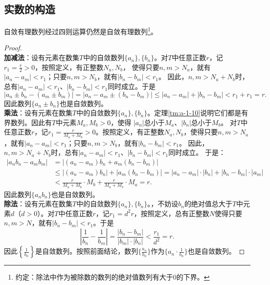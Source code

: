 \documentclass[12pt,UTF8]{ctexbook}
\begin{document}
\begin{appendix}
\section{实数的构造}

\begin{tm}\label{tm:a-1-3}
    自敛有理数列经过四则运算仍然是自敛有理数列\footnote{约定：除法中作为被除数的数列的绝对值数列有大于$0$的下界。}。
\end{tm}
\begin{proof}
    \mbox{} \\
    \textbf{加减法}：设有元素在数集$T$中的自敛数列$\{a_n\}, \{b_n\}$。对$T$中任意正数$r$，记$r_1=\frac{r}{2}>0$，按照定义，有正整数$N_a, N_b$，
    使得只要$n,m>N_a$，就有$|a_n - a_m| < r_1$；只要$n,m>N_b$，就有$|b_n - b_m| < r_1$。
    因此，$n,m>N_a+N_b$时，总有$|a_n - a_m| < r_1$、$|b_n - b_m| < r_1$同时成立。于是
    $$ |a_n \pm b_n - (a_m \pm b_m)| = |a_n - a_m \pm (b_n - b_m)| \leqslant |a_n - a_m| + |b_n - b_m| < r_1 + r_1 = r. $$
    因此数列$\{a_n \pm b_n\}$也是自敛数列。\\
    \textbf{乘法}：设有元素在数集$T$中的自敛数列$\{a_n\}, \{b_n\}$。定理\ref{tm:a-1-10}说明它们都是有界数列。因此有$T$中元素$M_a, M_b>0$，使得
    $|a_n|$总小于$M_a$、$|b_n|$总小于$M_b$。
    对$T$中任意正数$r$，记$r_1 = \frac{r}{M_a + M_b}>0$。按照定义，有正整数$N_a, N_b$，使得只要$n,m>N_a$，就有$|a_n - a_m| < r_1$；只要$n,m>N_b$，就有$|b_n - b_m| < r_1$。
    因此，$n,m>N_a+N_b$时，总有$|a_n - a_m| < r_1$、$|b_n - b_m| < r_1$同时成立。
    于是：
    \begin{align*}
        |a_nb_n - a_mb_m| &= |(a_n - a_m)b_n + a_m(b_n - b_m)|  \\
        &\leqslant |(a_n - a_m)b_n| + |a_m(b_n - b_m)| = |a_n - a_m|\cdot |b_n| + |b_n - b_m|\cdot|a_m|  \\
        &< \frac{r}{M_a + M_b} \cdot M_b + \frac{r}{M_a + M_b} \cdot M_a = r. 
    \end{align*}
    因此数列$\{a_n b_n\}$也是自敛数列。\\
    \textbf{除法}：设有元素在数集$T$中的自敛数列$\{a_n\}, \{b_n\}$。，不妨设$b_n$的绝对值总大于$T$中元素$d$（$d > 0$）。对$T$中任意正数$r$，记$r_1 = d^2r$，按照定义，总有正整数$N$使得只要$n,m>N$，就有$|b_n - b_m| < r_1$。于是
    $$ \left| \frac{1}{b_n} - \frac{1}{b_m}\right| = \frac{|b_n - b_m|}{|b_m|\cdot |b_n|} < \frac{r_1}{d^2} = r. $$
    因此$\left\{\frac{1}{b_n}\right\}$是自敛数列。按照前面结论，数列$\{\frac{a_n}{b_n}\}$作为$\{a_n \cdot \frac{1}{b_n}\}$也是自敛数列。
\end{proof}


\end{appendix}
\end{document}
